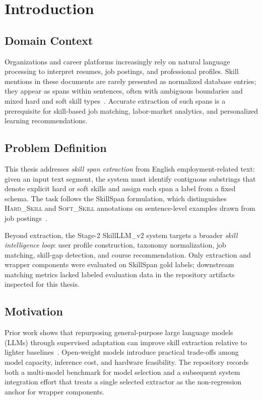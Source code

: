 \chapter{Introduction}
\label{ch:introduction}

\section{Domain Context}

Organizations and career platforms increasingly rely on natural language processing to interpret resumes, job postings, and professional profiles.
Skill mentions in these documents are rarely presented as normalized database entries; they appear as spans within sentences, often with ambiguous boundaries and mixed hard and soft skill types~\cite{zhang2022skillspan}.
Accurate extraction of such spans is a prerequisite for skill-based job matching, labor-market analytics, and personalized learning recommendations.

\section{Problem Definition}

This thesis addresses \emph{skill span extraction} from English employment-related text: given an input text segment, the system must identify contiguous substrings that denote explicit hard or soft skills and assign each span a label from a fixed schema.
The task follows the SkillSpan formulation, which distinguishes \textsc{Hard\_Skill} and \textsc{Soft\_Skill} annotations on sentence-level examples drawn from job postings~\cite{zhang2022skillspan}.

Beyond extraction, the Stage-2 SkillLLM\_v2 system targets a broader \emph{skill intelligence loop}: user profile construction, taxonomy normalization, job matching, skill-gap detection, and course recommendation.
Only extraction and wrapper components were evaluated on SkillSpan gold labels; downstream matching metrics lacked labeled evaluation data in the repository artifacts inspected for this thesis.

\section{Motivation}

Prior work shows that repurposing general-purpose large language models (LLMs) through supervised adaptation can improve skill extraction relative to lighter baselines~\cite{herandi2024skillllm}.
Open-weight models introduce practical trade-offs among model capacity, inference cost, and hardware feasibility.
The repository records both a multi-model benchmark for model selection and a subsequent system integration effort that treats a single selected extractor as the non-regression anchor for wrapper components.

